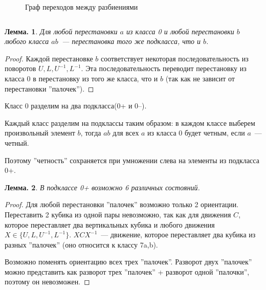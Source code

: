 \documentclass[utf8,russian]{beamer}
\newtheorem{ru_theo}{Лемма.}
\renewenvironment{theorem}{\begin{ru_theo}}{\end{ru_theo}}
\begin{document}
\begin{frame}
\begin{columns}[c]
\begin{figure}[c]
{
	}
	\caption{Граф переходов между разбиениями\label{states_graph}}
\end{figure}
\end{columns}
\end{frame}

\begin{frame}
	\begin{theorem}
		Для любой перестановки $a$ из класса 0 и любой перестановки $b$ любого класса $ab$~--- перестановка того же подкласса, что и $b$.
	\end{theorem}
	\begin{proof}
		Каждой перестановке $b$ соответствует некоторая последовательность из поворотов $U,L,U^{-1},L^{-1}$. Эта последовательность переводит перестановку из класса 0 в перестановку из того же класса, что и $b$ (так как не зависит от перестановки ''палочек''). 	
	\end{proof}
	Класс 0 разделим на два подкласса(0+ и 0--).
	
	Каждый класс разделим на подклассы таким образом:
	в каждом классе выберем произвольный элемент $b$, тогда $ab$ для всех $a$ из класса 0 будет четным, если $a$~--- четный.
	
	Поэтому ''четность'' сохраняется при умножении слева на элементы из подкласса 0+.
\end{frame}

\begin{frame}
\begin{theorem}
В подклассе 0+ возможно 6 различных состояний.
\end{theorem}
\begin{proof}
Для любой перестановки ''палочек'' возможно только 2 ориентации.
Переставить 2 кубика из одной пары невозможно, так как для движения $C$, которое переставляет два вертикальных кубика и любого движения $X\in\{U,L,U^{-1},L^{-1}\}$. $XCX^{-1}$~--- движение, которое переставляет два кубика из разных ''палочек'' (оно относится к классу 7a,b).

Возможно поменять ориентацию всех трех ''палочек''. Разворот двух ''палочек'' можно представить как разворот трех ''палочек'' + разворот одной ''палочки'', поэтому он невозможен.
\end{proof}
\end{frame}
\end{document}
